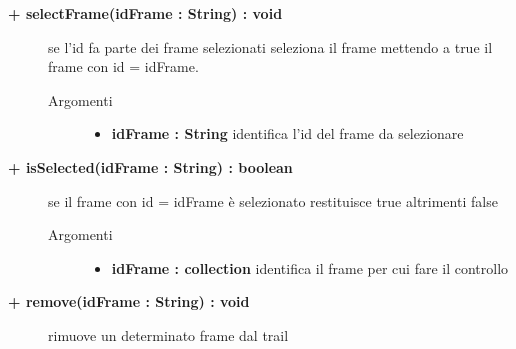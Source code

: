 \begin{description}
\begin{description}
\begin{description}
\begin{itemize}
				\end{itemize}
		\end{description}
	\end{description}
	
	\begin{description}
		\item[\textbf{\color{blue}+ selectFrame(idFrame : String) : void			}] \hfill
			se l'id fa parte dei frame selezionati seleziona il frame mettendo a true il frame con id = idFrame.
			
		\begin{description}
			\item[Argomenti] \hfill
				\begin{itemize}
				
					\item \textbf{idFrame : String			} \hfill
						identifica l'id del frame da selezionare
					
				\end{itemize}
		\end{description}
	\end{description}
	
	\begin{description}
		\item[\textbf{\color{blue}+ isSelected(idFrame : String) : boolean			}] \hfill
			se il frame con id = idFrame è selezionato restituisce true altrimenti false
			
		\begin{description}
			\item[Argomenti] \hfill
				\begin{itemize}
				
					\item \textbf{idFrame : collection			} \hfill
						identifica il frame per cui fare il controllo
					
				\end{itemize}
		\end{description}
	\end{description}
	
	\begin{description}
		\item[\textbf{\color{blue}+ remove(idFrame : String) : void			}] \hfill
			rimuove un determinato frame dal trail
			

\end{description}
\end{description}
